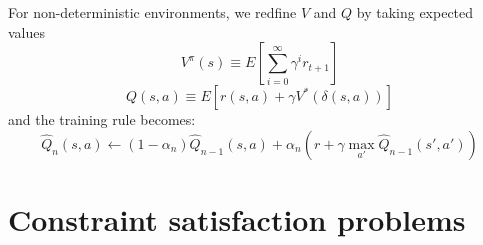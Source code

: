 \documentclass[12pt]{article}
\begin{document}
\begin{enumerate}[label=\textbf{RL.\arabic*}]
    For non-deterministic environments, we redfine $V$ and $Q$ by taking expected values
    \begin{equation}
        V^\pi(s) \equiv E[\sum_{i=0}^{\infty}\gamma^i r_{t+1}]
    \end{equation}
    \begin{equation}
        Q(s,a) \equiv E[r(s,a) + \gamma V^*(\delta(s,a))]
    \end{equation}
    and the training rule becomes:
    \begin{equation}
        \hat{Q}_n(s,a) \leftarrow (1-\alpha_n)\hat{Q}_{n-1}(s,a) + \alpha_n(r+\gamma\max_{a'}\hat{Q}_{n-1}(s',a'))
    \end{equation}
\end{enumerate}
\section{Constraint satisfaction problems}
\end{document}
